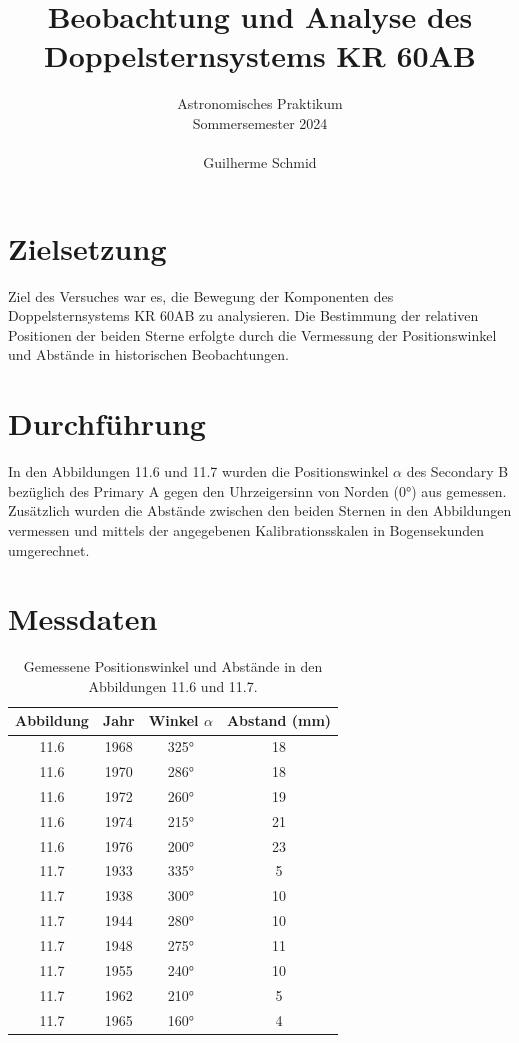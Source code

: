 \documentclass[a4paper,12pt]{article}
\title{Beobachtung und Analyse des Doppelsternsystems KR 60AB}
\author{Astronomisches Praktikum \\
Sommersemester 2024\\\\
Guilherme Schmid}
\date{}
\begin{document}
\maketitle

\section*{Zielsetzung}
Ziel des Versuches war es, die Bewegung der Komponenten des Doppelsternsystems KR 60AB zu analysieren. Die Bestimmung der relativen Positionen der beiden Sterne erfolgte durch die Vermessung der Positionswinkel und Abstände in historischen Beobachtungen.

\section*{Durchführung}
In den Abbildungen 11.6 und 11.7 wurden die Positionswinkel \( \alpha \) des Secondary B bezüglich des Primary A gegen den Uhrzeigersinn von Norden (0°) aus gemessen. Zusätzlich wurden die Abstände zwischen den beiden Sternen in den Abbildungen vermessen und mittels der angegebenen Kalibrationsskalen in Bogensekunden umgerechnet.

\section*{Messdaten}

\begin{table}[H]
\centering
\begin{tabular}{|c|c|c|c|}
\hline
Abbildung & Jahr & Winkel \( \alpha \) & Abstand (mm) \\ \hline
11.6      & 1968 & 325°              & 18           \\ \hline
11.6      & 1970 & 286°              & 18           \\ \hline
11.6      & 1972 & 260°              & 19           \\ \hline
11.6      & 1974 & 215°              & 21           \\ \hline
11.6      & 1976 & 200°              & 23           \\ \hline
11.7      & 1933 & 335°              & 5            \\ \hline
11.7      & 1938 & 300°              & 10           \\ \hline
11.7      & 1944 & 280°              & 10           \\ \hline
11.7      & 1948 & 275°              & 11           \\ \hline
11.7      & 1955 & 240°              & 10           \\ \hline
11.7      & 1962 & 210°              & 5            \\ \hline
11.7      & 1965 & 160°              & 4            \\ \hline
\end{tabular}
\caption{Gemessene Positionswinkel und Abstände in den Abbildungen 11.6 und 11.7.}
\end{table}
\end{document}
